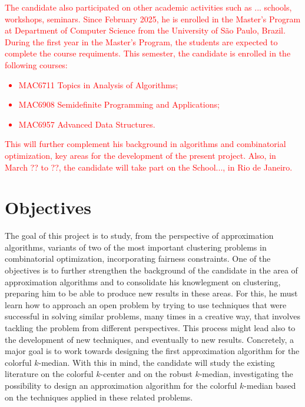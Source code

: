 \documentclass[12pt]{article}
\begin{document}
\textcolor{red}{The candidate also participated on other academic activities such as ... schools, workshops, seminars. 
Since February 2025, he is enrolled in the Master's Program at Department of Computer Science from the University of São Paulo, Brazil.  
During the first year in the Master's Program, the students are expected to complete the course requiments. 
This semester, the candidate is enrolled in the following courses: 
\begin{itemize} 
  \item MAC6711 Topics in Analysis of Algorithms;
  \item MAC6908 Semidefinite Programming and Applications;
  \item MAC6957 Advanced Data Structures.
\end{itemize}
This will further complement his background in algorithms and combinatorial optimization, key areas for the development of the present project.  Also, in March ?? to ??, the candidate will take part on the School..., in Rio de Janeiro.}


\section{Objectives}


The goal of this project is to study, from the perspective of approximation algorithms, variants of two of 
the most important clustering problems in combinatorial optimization, incorporating fairness constraints.
One of the objectives is to further strengthen the background of the candidate in the area of approximation algorithms
and to consolidate his knowlegment on clustering, preparing him to be able to produce new results in these areas.  
For this, he must learn how to approach an open problem by trying to use techniques that were successful in solving 
similar problems, many times in a creative way, that involves tackling the problem from different perspectives.  
This process might lead also to the development of new techniques, and eventually to new results. 
Concretely, a major goal is to work towards designing the first approximation algorithm for the colorful $k$-median. 
With this in mind, the candidate will study the existing literature on the colorful $k$-center and on the robust $k$-median, 
investigating the possibility to design an approximation algorithm for the colorful $k$-median based 
on the techniques applied in these related problems.
\end{document}
